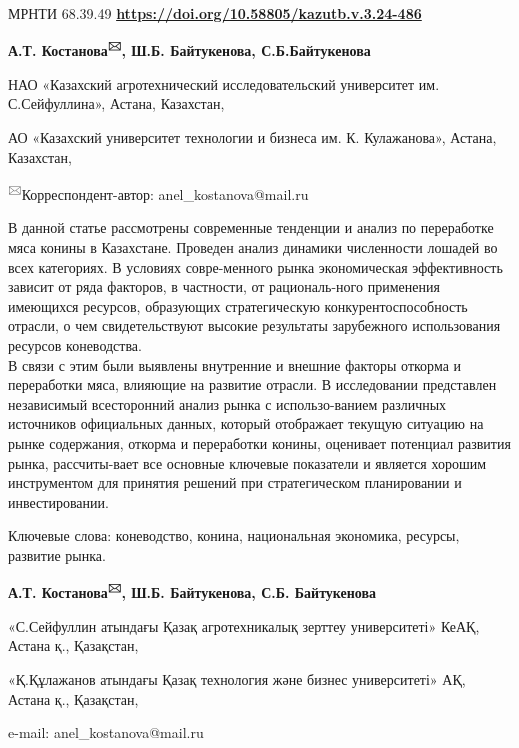 \newpage
МРНТИ 68.39.49
\hfill {\bfseries \href{https://doi.org/10.58805/kazutb.v.3.24-486}{https://doi.org/10.58805/kazutb.v.3.24-486}}


\begin{center}

{\bfseries А.Т. Костанова\textsuperscript{🖂}, Ш.Б. Байтукенова, С.Б.Байтукенова}

НАО «Казахский агротехнический исследовательский университет им.
С.Сейфуллина», Астана, Казахстан,

АО «Казахский университет технологии и бизнеса им. К. Кулажанова», Астана, Казахстан,
\end{center}

\textsuperscript{🖂}Корреспондент-автор: anel\_kostanova@mail.ru\vspace{0.5cm}

В данной статье рассмотрены современные тенденции и анализ по
переработке мяса конины в Казахстане. Проведен анализ динамики
численности лошадей во всех категориях. В условиях совре-менного рынка
экономическая эффективность зависит от ряда факторов, в частности, от
рациональ-ного применения имеющихся ресурсов, образующих стратегическую
конкурентоспособность отрасли, о чем свидетельствуют высокие результаты
зарубежного использования ресурсов коневодства. \\В связи с этим были
выявлены внутренние и внешние факторы откорма и переработки мяса,
влияющие на развитие отрасли. В исследовании представлен независимый
всесторонний анализ рынка с использо-ванием различных источников
официальных данных, который отображает текущую ситуацию на рынке
содержания, откорма и переработки конины, оценивает потенциал развития
рынка, рассчиты-вает все основные ключевые показатели и является хорошим
инструментом для принятия решений при стратегическом планировании и
инвестировании.

Ключевые слова: коневодство, конина, национальная экономика, ресурсы,
развитие рынка.

\begin{center}

{\bfseries А.Т. Костанова\textsuperscript{🖂}, Ш.Б. Байтукенова, С.Б.
Байтукенова}

«С.Сейфуллин атындағы Қазақ агротехникалық зерттеу университеті» КеАҚ, Астана қ., Қазақстан,

«Қ.Құлажанов атындағы Қазақ технология және бизнес университеті» АҚ, Астана қ., Қазақстан,

e-mail: anel\_kostanova@mail.ru
\end{center}

